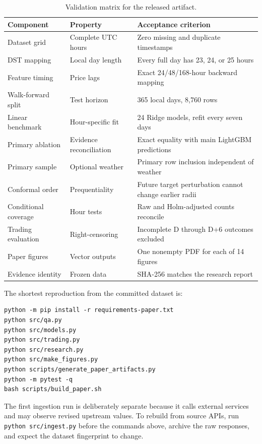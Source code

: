 \documentclass[11pt]{article}
\begin{document}
\begin{table}[h]
\centering
\caption{Validation matrix for the released artifact.}
\label{tab:validation}
\small
\begin{tabular}{p{}p{}p{}}
\toprule
Component & Property & Acceptance criterion \\
\midrule
Dataset grid & Complete UTC hours & Zero missing and duplicate timestamps \\
DST mapping & Local day length & Every full day has 23, 24, or 25 hours \\
Feature timing & Price lags & Exact 24/48/168-hour backward mapping \\
Walk-forward split & Test horizon & 365 local days, 8,760 rows \\
Linear benchmark & Hour-specific fit & 24 Ridge models, refit every seven days \\
Primary ablation & Evidence reconciliation & Exact equality with main
LightGBM predictions \\
Primary sample & Optional weather & Primary row inclusion independent of weather \\
Conformal order & Prequentiality & Future target perturbation cannot change
earlier radii \\
Conditional coverage & Hour tests & Raw and Holm-adjusted counts reconcile \\
Trading evaluation & Right-censoring & Incomplete D through D+6 outcomes
excluded \\
Paper figures & Vector outputs & One nonempty PDF for each of 14 figures \\
Evidence identity & Frozen data & SHA-256 matches the research report \\
\bottomrule
\end{tabular}
\end{table}

The shortest reproduction from the committed dataset is:

\begin{verbatim}
python -m pip install -r requirements-paper.txt
python src/qa.py
python src/models.py
python src/trading.py
python src/research.py
python src/make_figures.py
python scripts/generate_paper_artifacts.py
python -m pytest -q
bash scripts/build_paper.sh
\end{verbatim}

The first ingestion run is deliberately separate because it calls external
services and may observe revised upstream values.  To rebuild from source
APIs, run \texttt{python src/ingest.py} before the commands above, archive the
raw responses, and expect the dataset fingerprint to change.



\end{document}
